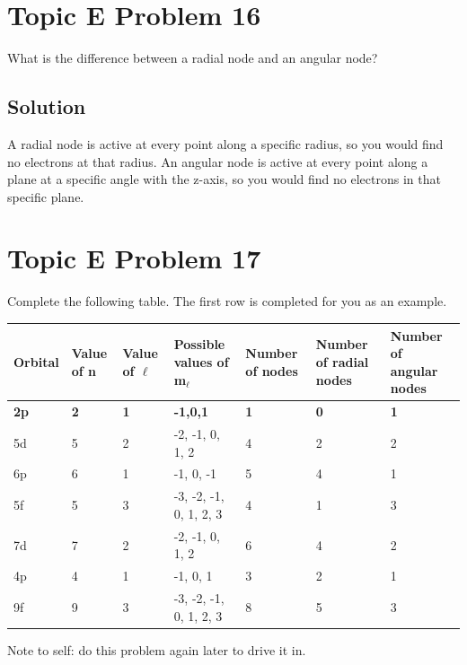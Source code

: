 \documentclass[10pt]{article}
\begin{document}
    \pagebreak
    \section{Topic E Problem 16}
        What is the difference between a radial node and an angular node?

        \subsection{Solution}
            A radial node is active at every point along a specific radius, so you would find no electrons at that radius.
            An angular node is active at every point along a plane at a specific angle with the z-axis, so you would find no electrons in that specific plane.

    \pagebreak
    \section{Topic E Problem 17}
        Complete the following table. 
        The first row is completed for you as an example.\\
        \begin{tabular}{| m{1cm} | m{1cm} | m{1cm} | m{1.5cm} | m{1.5cm} | m{1.5cm} | m{1.5cm} |}
            \hline
            Orbital &   Value of n  &   Value of $\ell$   &   \small Possible values of m$_\ell$ &   \small Number of nodes &   \small Number of radial nodes  &   \small Number of angular nodes\\
            \hline
            \textbf{2p} &   \textbf{2}  &   \textbf{1}  &   \textbf{-1,0,1} &   \textbf{1}  &   \textbf{0}  &   \textbf{1}\\
            \hline
            5d  &   5   &   2   &   -2, -1, 0, 1, 2 &   4   &   2   &   2\\
            \hline
            6p & 6 & 1 & -1, 0, -1 & 5 & 4 & 1\\
            \hline 
            5f & 5 & 3 & -3, -2, -1, 0, 1, 2, 3 & 4 & 1 & 3\\
            \hline
            7d & 7 & 2 & -2, -1, 0, 1, 2 & 6 & 4 & 2\\
            \hline
            4p & 4 & 1 & -1, 0, 1 & 3 & 2 & 1\\
            \hline
            9f & 9 & 3 & -3, -2, -1, 0, 1, 2, 3 & 8 & 5 & 3\\
            \hline
        \end{tabular}

        Note to self: do this problem again later to drive it in. 
\end{document}
